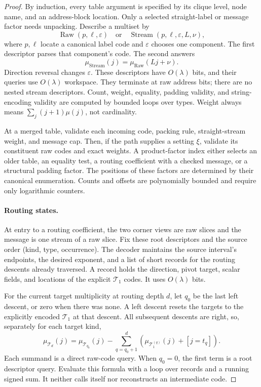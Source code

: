 \documentclass[11pt]{article}
\theoremstyle{definition}
\theoremstyle{remark}
\begin{document}
\begin{proof}
By induction, every table argument is specified by its clique level, node name, and an address-block location. Only a selected straight-label or message factor needs unpacking. Describe a multiset by
\[
 \operatorname{Raw}(p,\ell,\varepsilon)
 \quad\text{or}\quad
 \operatorname{Stream}(p,\ell,\varepsilon,L,\nu),
\]
where $p,\ell$ locate a canonical label code and $\varepsilon$ chooses one component. The first descriptor parses that component's code. The second answers
\[
 \mu_{\operatorname{Stream}}(j)=\mu_{\operatorname{Raw}}(Lj+\nu).
\]
Direction reversal changes $\varepsilon$. These descriptors have $O(\lambda)$ bits, and their queries use $O(\lambda)$ workspace. They terminate at raw address bits; there are no nested stream descriptors. Count, weight, equality, padding validity, and string-encoding validity are computed by bounded loops over types. Weight always means $\sum_j(j+1)\mu(j)$, not cardinality.

At a merged table, validate each incoming code, packing rule, straight-stream weight, and message cap. Then, if the path supplies a setting $\xi$, validate its constituent raw codes and exact weights. A product-factor index either selects an older table, an equality test, a routing coefficient with a checked message, or a structural padding factor. The positions of these factors are determined by their canonical enumeration. Counts and offsets are polynomially bounded and require only logarithmic counters.

\paragraph{Routing states.}
At entry to a routing coefficient, the two corner views are raw slices and the message is one stream of a raw slice. Fix these root descriptors and the source order (kind, type, occurrence). The decoder maintains the source interval's endpoints, the desired exponent, and a list of short records for the routing descents already traversed. A record holds the direction, pivot target, scalar fields, and locations of the explicit $\mathcal T_1$ codes. It uses $O(\lambda)$ bits.

For the current target multiplicity at routing depth $d$, let $q_0$ be the last left descent, or zero when there was none. A left descent resets the targets to the explicitly encoded $\mathcal T_1$ at that descent. All subsequent descents are right, so, separately for each target kind,
\begin{equation}\label{eq:telescope}
 \mu_{\mathcal T_d}(j)=\mu_{\mathcal T_{q_0}}(j)
 -\sum_{q=q_0+1}^d\left(\mu_{\mathcal T_1^{(q)}}(j)+[j=t_q]\right).
\end{equation}
Each summand is a direct raw-code query. When $q_0=0$, the first term is a root descriptor query. Evaluate this formula with a loop over records and a running signed sum. It neither calls itself nor reconstructs an intermediate code.


\end{proof}
\end{document}
